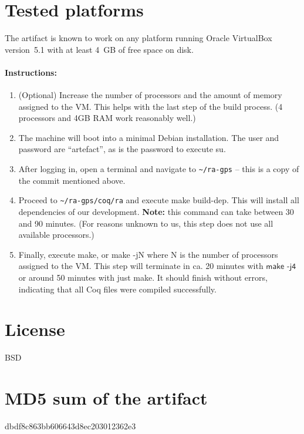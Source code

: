\documentclass[a4paper,UKenglish]{darts}
\newenvironment{platforms}{\section{Tested platforms}}{}
\newcommand{\license}[1]{{\section{License}#1}}
\newcommand{\mdsum}[1]{{\section{MD5 sum of the artifact}#1}}
\begin{document}
\begin{platforms}
  The artifact is known to work on any platform running Oracle VirtualBox
  version~5.1 with at least 4~GB of free space on disk.

  \paragraph*{Instructions:}
  \begin{enumerate}
  \item (Optional) Increase the number of processors and the amount of memory
    assigned to the VM. This helps with the last step of the build process. (4
    processors and 4GB RAM work reasonably well.)
  \item The machine will boot into a minimal Debian installation. The user and
    password are ``artefact'', as is the password to execute \textsf{su}.
  \item After logging in, open a terminal and navigate to
    \texttt{\textasciitilde/ra-gps} -- this is a copy of the commit mentioned
    above.
  \item Proceed to \texttt{\textasciitilde/ra-gps/coq/ra} and execute \textsf{make
      build-dep}.
    This will install all dependencies of our development. \textbf{Note:} this
    command can take between 30 and 90 minutes. (For reasons unknown to us, this
    step does not use all available processors.)
  \item Finally, execute \textsf{make}, or \textsf{make -jN} where N is the number
    of processors assigned to the VM. This step will terminate in ca. 20 minutes
    with ${\textsf{make~-j4}}$ or around 50 minutes with just \textsf{make}. It should finish
    without errors, indicating that all Coq files were compiled successfully.
  \end{enumerate}

\end{platforms}

\license{BSD}

\mdsum{dbdf8c863bb606643d8ec203012362e3}
\end{document}
